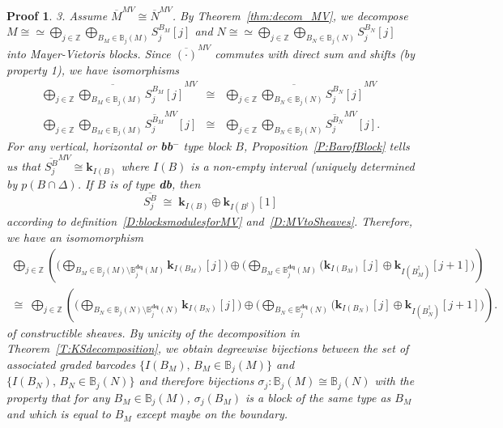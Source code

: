 \documentclass[a4paper, english, 11pt]{article}
\newcommand{\kk}[0]{\textbf{k}}
\newcommand{\0}{\vec{0}}
\newcommand{\Z}[0]{\mathbb{Z}}
\newtheorem*{pf}{Proof} }
\begin{document}
\begin{pf}
3. Assume $\overline{M}^{MV} \cong \overline{N}^{MV}$. By Theorem~\ref{thm:decom_MV}, we decompose 
$M\cong \simeq \bigoplus_{j\in \Z} \bigoplus_{B_M \in \mathbb{B}_j(M)}S_j^{B_M}[j]$ and 
$N \cong \simeq \bigoplus_{j\in \Z} \bigoplus_{B_N \in \mathbb{B}_j(N)}S_j^{B_N}[j]$ into  Mayer-Vietoris blocks.
Since $\overline{(\cdot)}^{MV}$ commutes with direct 
sum and shifts (by property 1),  we have isomorphisms
\begin{eqnarray*}
 \overline{ \bigoplus_{j\in \Z} \bigoplus_{B_M\in \mathbb{B}_j(M)}S_j^{B_M}[j]}^{MV} &\cong&
 \overline{\bigoplus_{j\in \Z} \bigoplus_{B_N\in \mathbb{B}_j(N)}S_j^{B_N}[j] }^{MV}  \\ 
 \bigoplus_{j\in \Z} \bigoplus_{B_M\in \mathbb{B}_j(M)} \overline{S_j^{B_M}}^{MV}[j] &\cong& 
 \bigoplus_{j\in \Z} \bigoplus_{B_N\in \mathbb{B}_j(N)} \overline{S_j^{B_N} }^{MV}[j].
\end{eqnarray*}
For any vertical, horizontal or \textbf{bb}$^-$ type block $B$, Proposition~\ref{P:BarofBlock} tells us that  
$\overline{S_j^{B}}^{MV} \cong \kk_{I(B)}$ where $I(B)$ is a non-empty interval (uniquely determined by $p(B\cap \Delta)$. 
If $B$ is of type \textbf{db}, then 
$$
 \overline{S_j^{B}} \; \cong \;  \kk_{I(B)} \oplus \kk_{I(B^\dag)}[1]
$$
according to definition~\ref{D:blocksmodulesforMV} and~\ref{D:MVtoSheaves}.  
Therefore, we have an isomomorphism 
\begin{multline}
 \label{eq:decofBarMV} 
 \bigoplus_{j\in \Z} \left(\Big(\bigoplus_{B_M\in \mathbb{B}_j(M)\setminus \mathbb{B}^{\textbf{dq}}_j(M)} \kk_{I(B_M)}[j] \Big) \oplus 
 \Big(\bigoplus_{B_M\in \mathbb{B}^{\textbf{dq}}_j(M) } \big(\kk_{I(B_M)}[j] \oplus \kk_{I(B_M^\dag)}[j+1]\Big)\right)\\
 \cong \; 
 \bigoplus_{j\in \Z} \left(\Big(\bigoplus_{B_N\in \mathbb{B}_j(N) \setminus \mathbb{B}^{\textbf{dq}}_j(N)} \kk_{I(B_N)}[j]\Big)\oplus 
\Big( \bigoplus_{B_N\in \mathbb{B}^{\textbf{dq}}_j(N) } \big(\kk_{I(B_N)}[j] \oplus \kk_{I(B_N^\dag)}[j+1]\Big)\right).
\end{multline}
of constructible sheaves. By unicity of the decomposition in Theorem~\ref{T:KSdecomposition}, we obtain  degreewise bijections between 
the set of associated graded barcodes $\{ I(B_M), \, B_M \in  \mathbb{B}_j(M)\}$ and $\{ I(B_N), \, B_N \in  \mathbb{B}_j(N)\}$
and therefore  bijections $\sigma_j: \mathbb{B}_j(M) \cong \mathbb{B}_j(N)$ with the property that  for any $B_M\in \mathbb{B}_j(M)$, 
$\sigma_j(B_M)$ is a block of the same type as $B_M$ and which is equal to $B_M$ except maybe on the boundary.




\end{pf}
\end{document}
